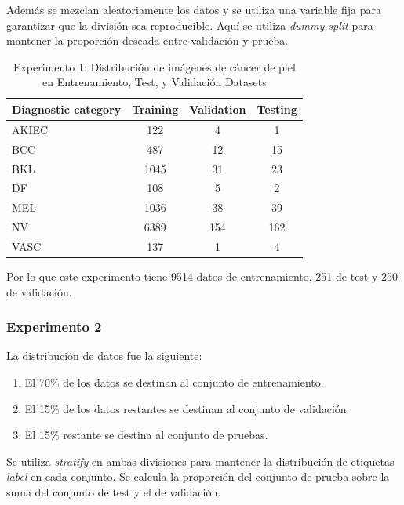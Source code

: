    Además se mezclan aleatoriamente los datos y se utiliza una variable fija para garantizar que la división sea reproducible. Aquí se utiliza \textit{dummy split} para mantener la proporción deseada entre validación y prueba.

   \begin{table}[ht]
      \centering
      \begin{tabular}{lccc}
      \hline
      Diagnostic category & Training & Validation & Testing \\ \hline
      AKIEC & 122 & 4 & 1 \\
      BCC & 487 & 12 & 15 \\
      BKL & 1045 & 31 & 23 \\
      DF & 108 & 5 & 2 \\
      MEL & 1036 & 38 & 39 \\
      NV & 6389 & 154 & 162 \\
      VASC & 137 & 1 & 4 \\ \hline
      \end{tabular}
      \caption{Experimento 1: Distribución de imágenes de cáncer de piel en Entrenamiento, Test, y Validación Datasets}
      \label{tab:train_test_validate_e1}
      \end{table}

Por lo que este experimento tiene 9514 datos de entrenamiento, 251 de test y 250 de validación.

\subsubsection{Experimento 2}

La distribución de datos fue la siguiente:

   \begin{enumerate}
      \item El 70\% de los datos se destinan al conjunto de entrenamiento.
      \item El 15\% de los datos restantes se destinan al conjunto de validación.
      \item El 15\% restante se destina al conjunto de pruebas.
   \end{enumerate}
   
Se utiliza \textit{stratify} en ambas divisiones para mantener la distribución de etiquetas \textit{label} en cada conjunto. Se calcula la proporción del conjunto de prueba sobre la suma del conjunto de test y el de validación. 


